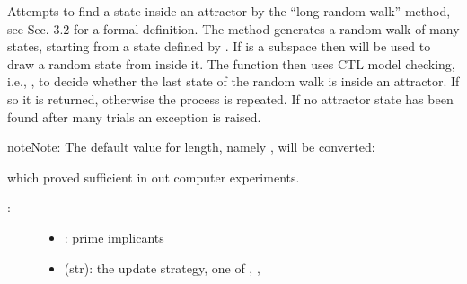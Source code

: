 \documentclass[letterpaper,10pt,english]{sphinxmanual}
\begin{document}
\begin{fulllineitems}
\label{\detokenize{AttractorDetection:PyBoolNet.AttractorDetection.find_attractor_state_by_randomwalk_and_ctl}}
Attempts to find a state inside an attractor by the “long random walk” method,
see {\hyperref[\detokenize{Bibliography:klarner2015approx}]{}} Sec. 3.2 for a formal definition.
The method generates a random walk of  many states, starting from a state defined by .
If  is a subspace then {\hyperref[\detokenize{StateTransitionGraphs:random-state}]{}} will be used to draw a random state from inside it.
The function then uses CTL model checking, i.e., {\hyperref[\detokenize{ModelChecking:check-primes}]{}},
to decide whether the last state of the random walk is inside an attractor.
If so it is returned, otherwise the process is repeated.
If no attractor state has been found after  many trials an exception is raised.

\begin{sphinxadmonition}{note}{Note:}
The default value for length, namely , will be converted:

\begin{sphinxVerbatim}[commandchars=\\\{\}]
  
\end{sphinxVerbatim}

which proved sufficient in out computer experiments.
\end{sphinxadmonition}
\begin{description}
\item[{:}] \leavevmode\begin{itemize}
\item {} 
: prime implicants

\item {} 
 (str):  the update strategy, one of , , 


\end{itemize}
\end{description}
\end{fulllineitems}
\end{document}
